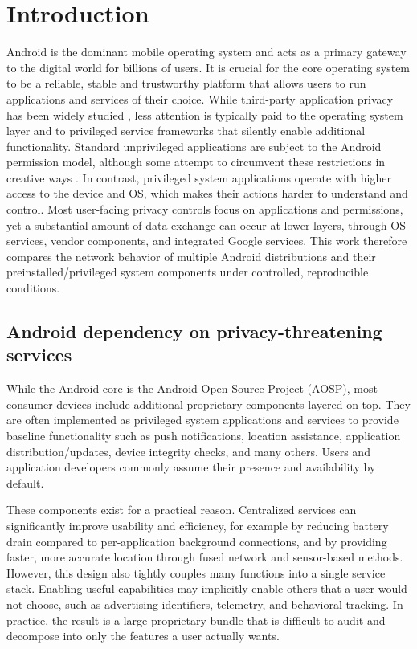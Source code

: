 \section{Introduction}
Android is the dominant mobile operating system and acts as a primary gateway to the digital world for billions of users. It is crucial for the core operating system to be a reliable, stable and trustworthy platform that allows users to run applications and services of their choice. While third-party application privacy has been widely studied \cite{appDataCollection1,appDataCollection2,appDataCollection3,appDataCollection4}, less attention is typically paid to the operating system layer and to privileged service frameworks that silently enable additional functionality. Standard unprivileged applications are subject to the Android permission model, although some attempt to circumvent these restrictions in creative ways \cite{appDataCollection5Circumvention,appDataCollection6Circumvention}. In contrast, privileged system applications operate with higher access to the device and OS, which makes their actions harder to understand and control. Most user-facing privacy controls focus on applications and permissions, yet a substantial amount of data exchange can occur at lower layers, through OS services, vendor components, and integrated Google services. This work therefore compares the network behavior of multiple Android distributions and their preinstalled/privileged system components under controlled, reproducible conditions.

\subsection{Android dependency on privacy-threatening services}
While the Android core is the Android Open Source Project (AOSP), most consumer devices include additional proprietary components layered on top. They are often implemented as privileged system applications and services to provide baseline functionality such as push notifications, location assistance, application distribution/updates, device integrity checks, and many others. Users and application developers commonly assume their presence and availability by default. 

These components exist for a practical reason. Centralized services can significantly improve usability and efficiency, for example by reducing battery drain compared to per‑application background connections, and by providing faster, more accurate location through fused network and sensor-based methods. However, this design also tightly couples many functions into a single service stack. Enabling useful capabilities may implicitly enable others that a user would not choose, such as advertising identifiers, telemetry, and behavioral tracking. In practice, the result is a large proprietary bundle that is difficult to audit and decompose into only the features a user actually wants.

